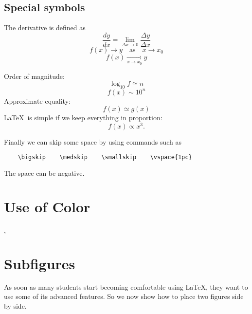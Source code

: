 \documentclass[12pt]{article}
\begin{document}
																			      \subsection{Special symbols}

																			      The derivative is defined as
																			      \begin{equation}
																			      \frac{dy}{dx} = \lim_{\Delta x \to 0} \frac{\Delta y}
{\Delta x}
\end{equation}
\begin{equation}
f(x) \to y \quad \mbox{as} \quad x \to
x_{0}
\end{equation}
\begin{equation}
f(x) \mathop {\longrightarrow}
\limits_{x \to x_0} y
\end{equation}

\noindent Order of magnitude:
\begin{equation}
\log_{10}f \simeq n
\end{equation}
\begin{equation}
f(x)\sim 10^{n}
\end{equation}
Approximate equality:
\begin{equation}
f(x)\simeq g(x)
	\end{equation}
	\LaTeX\ is simple if we keep everything in proportion:
	\begin{equation}
	f(x) \propto x^3 .
	\end{equation}

	Finally we can skip some space by using commands such as
	\begin{verbatim}
	\bigskip    \medskip    \smallskip    \vspace{1pc}
	\end{verbatim}
	The space can be negative.

	\section{\color{red}Use of Color}

{\color{blue}{We can change colors for emphasis}},
{\color{green}{but}} {\color{cyan}{who is going pay for the ink?}}

\section{\label{morefig}Subfigures}

As soon as many students start becoming comfortable using \LaTeX,
   they want
   to use some of its advanced features. So we now show how to place two
   figures side by side.
\end{document}
